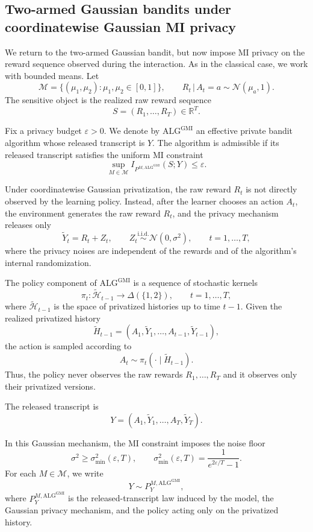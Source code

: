 \documentclass[journal]{IEEEtran}
\newcommand{\ALG}{\mathrm{ALG}}
\begin{document}
\subsection{Two-armed Gaussian bandits under coordinatewise Gaussian MI privacy}
\label{sec:private-bandit}

We return to the two-armed Gaussian bandit, but now impose MI privacy on the
reward sequence observed during the interaction. As in the classical case, we
work with bounded means. Let
\[
\mathcal M
=
\{(\mu_1,\mu_2):\mu_1,\mu_2\in[0,1]\},
\qquad
R_t\,|\,A_t=a \sim \mathcal N(\mu_a,1).
\]
The sensitive object is the realized raw reward sequence
\[
S=(R_1,\dots,R_T)\in\mathbb R^T.
\]

Fix a privacy budget \(\varepsilon>0\). We denote by
\(\ALG^{\mathrm{GMI}}\) an effective private bandit algorithm whose released
transcript is \(Y\). The algorithm is admissible if its released transcript
satisfies the uniform MI constraint
\[
\sup_{M\in\mathcal M}
I_{P^{M,\ALG^{\mathrm{GMI}}}}(S;Y)
\le \varepsilon.
\]

Under coordinatewise Gaussian privatization, the raw reward \(R_t\) is not
directly observed by the learning policy. Instead, after the learner chooses an
action \(A_t\), the environment generates the raw reward \(R_t\), and the
privacy mechanism releases only
\[
\widetilde Y_t = R_t + Z_t,
\qquad
Z_t \stackrel{\mathrm{i.i.d.}}{\sim} \mathcal N(0,\sigma^2),
\qquad
t=1,\dots,T,
\]
where the privacy noises are independent of the rewards and of the algorithm's
internal randomization. 

The policy component of \(\ALG^{\mathrm{GMI}}\) is a sequence of stochastic
kernels
\[
\pi_t:\widetilde{\mathcal H}_{t-1}\to\Delta(\{1,2\}),
\qquad t=1,\dots,T,
\]
where \(\widetilde{\mathcal H}_{t-1}\) is the space of privatized histories up
to time \(t-1\). Given the realized privatized history
\[
\widetilde H_{t-1}
=
(A_1,\widetilde Y_1,\dots,A_{t-1},\widetilde Y_{t-1}),
\]
the action is sampled according to
\[
A_t \sim \pi_t(\cdot \mid \widetilde H_{t-1}).
\]
Thus, the policy never observes the raw rewards \(R_1,\dots,R_T\) and it observes
only their privatized versions.

The released transcript is
\[
Y=(A_1,\widetilde Y_1,\dots,A_T,\widetilde Y_T).
\]


In this Gaussian mechanism, the MI constraint imposes the noise floor
\[
\sigma^2\ge \sigma_{\min}^2(\varepsilon,T),
\qquad
\sigma_{\min}^2(\varepsilon,T)
=
\frac{1}{e^{2\varepsilon/T}-1}.
\]
For each \(M\in\mathcal M\), we write
\[
Y\sim P_Y^{M,\ALG^{\mathrm{GMI}}},
\]
where \(P_Y^{M,\ALG^{\mathrm{GMI}}}\) is the released-transcript law induced
by the model, the Gaussian privacy mechanism, and the policy acting only on the
privatized history.
\end{document}
